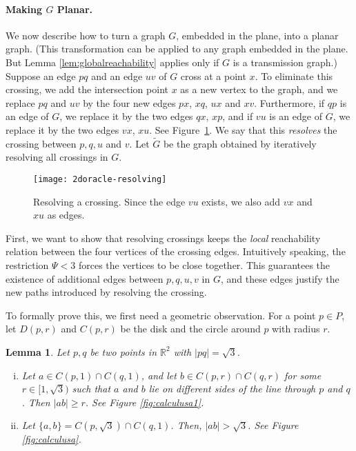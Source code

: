 \documentclass[11pt,a4paper]{paper}
\newtheorem{lemma}[theorem]{Lemma}
\newcommand{\mathset}[1]{\ensuremath {\mathbb {#1}}}
\newcommand{\R}{\mathset{R}}
\begin{document}
\paragraph*{Making $G$ Planar.}
We now describe how to turn a graph $G$, embedded in the plane, into a planar graph. (This transformation can be applied to
any graph embedded in the plane. But Lemma \ref{lem:globalreachability} applies only if $G$ is a transmission graph.)
Suppose an edge $pq$
and an edge $uv$ of $G$
cross at a point $x$.
To eliminate this crossing, we add the intersection 
point $x$ as a new vertex to the graph, and we replace
$pq$ and $uv$ by the four new
edges $px$, $xq$, $ux$
and $xv$.
Furthermore, if $qp$ is an edge of $G$, we replace it by
the two edges $qx$, $xp$,
and if $vu$ is an edge of $G$, we replace it by
the two edges $vx$, $xu$. See Figure~\ref{fig:resolving}.
We say that this \emph{resolves} the crossing between $p,q,u$ and $v$.
Let $\widetilde{G}$ be the graph obtained by iteratively resolving all
crossings in $G$.
\begin{figure}[htb]
\centering
\texttt{[image: 2doracle-resolving]}
\caption{Resolving a crossing. Since the edge $vu$ exists, we also add $vx$ and
$xu$ as edges.}
\label{fig:resolving}
\end{figure}

First, we want to show that resolving crossings keeps the \emph{local}
reachability relation between the four vertices of the crossing edges.
Intuitively speaking, the  restriction $\Psi < 3$
forces the vertices to be close together. This guarantees the existence of
additional edges between $p,q,u,v$ in $G$, and these edges
justify the new paths introduced by resolving the crossing.

To formally prove this, we first need a geometric observation.
For a point $p \in P$,
let $D(p,r)$ and $C(p, r)$ be the disk and the circle around
$p$ with radius $r$.

\begin{lemma}
\label{lem:calculus}
Let $p,q$ be two points in $\R^2$ with $|pq| = \sqrt{3}$.
\begin{enumerate}[(i)]
\item Let $a \in C(p,1) \cap C(q,1)$, and let  $b \in C(p,r) \cap C(q,r)$ for
some $r \in [1,\sqrt{3})$ such that
$a$ and $b$ lie on different
 sides of the line through $p$ and $q$.  Then $|ab| \geq r$. See Figure \ref{fig:calculusa1}.
\item Let
$\{a,b\} = C(p,\sqrt{3}) \cap C(q,1)$. Then, $|ab| > \sqrt{3}$. See Figure \ref{fig:calculusa}.
\end{enumerate}
\end{lemma}
\end{document}
